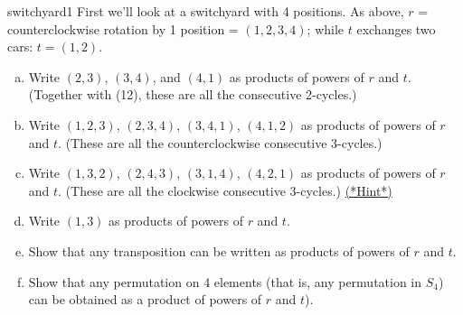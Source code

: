 \begin{exercise}{switchyard1}
First we'll look at a switchyard with 4 positions.  As above, $r$ = counterclockwise rotation by 1 position = $(1, 2, 3, 4)$; while $t$  exchanges two cars: $t = (1,2)$. 
\begin{enumerate}[(a)]
\item
Write $(2,3)$, $(3,4)$, and $(4,1)$ as products of powers of $r$ and $t$. (Together with (12), these are all the  consecutive 2-cycles.)
\item
Write $(1,2,3)$, $(2,3,4)$, $(3,4,1)$, $(4,1,2)$ as products of powers of $r$ and $t$. (These are all the counterclockwise consecutive  3-cycles.)
\item
Write $(1,3,2)$, $(2,4,3)$, $(3,1,4)$, $(4,2,1)$ as products of powers of $r$ and $t$. (These are all the clockwise consecutive 3-cycles.)
\hyperref[sec:permute:hints]{(*Hint*)}
\item
Write $(1,3)$ as products of powers of $r$ and $t$.
\item
Show that any transposition can be written as products of powers of $r$ and $t$.
\item
Show that any permutation  on 4 elements (that is, any permutation in $S_4$) can be obtained as a product of powers of $r$ and $t$).
\end{enumerate}
\end{exercise}

